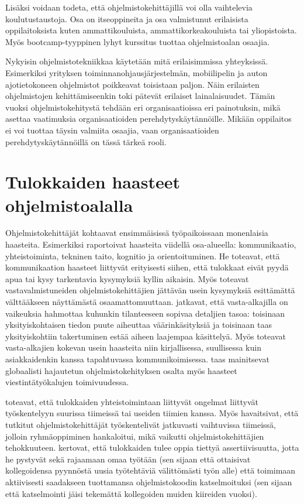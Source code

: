 \documentclass[utf8]{gradu3}
\begin{document}
Lisäksi voidaan todeta, että ohjelmistokehittäjillä voi olla vaihtelevia koulutustaustoja. Osa on itseoppineita ja osa valmistunut erilaisista oppilaitoksista kuten ammattikouluista, ammattikorkeakouluista tai yliopistoista. Myös bootcamp-tyyppinen lyhyt kurssitus tuottaa ohjelmistoalan osaajia. 

Nykyisin ohjelmistotekniikkaa käytetään mitä erilaisimmissa yhteyksissä. Esimerkiksi yrityksen toiminnanohjausjärjestelmän, mobiilipelin ja auton ajotietokoneen ohjelmistot poikkeavat toisistaan paljon. Näin erilaisten ohjelmistojen kehittämiseenkin toki pätevät erilaiset lainalaisuudet. Tämän vuoksi ohjelmistokehitystä tehdään eri organisaatioissa eri painotuksin, mikä asettaa vaatimuksia organisaatioiden perehdytyskäytännöille. Mikään oppilaitos ei voi tuottaa täysin valmiita osaajia, vaan organisaatioiden perehdytyskäytännöillä on tässä tärkeä rooli.

\section{Tulokkaiden haasteet ohjelmistoalalla}
\label{luku-tulokkaiden-haasteet}

Ohjelmistokehittäjät kohtaavat ensimmäisissä työpaikoissaan monenlaisia haasteita. Esimerkiksi \textcite{begel-simon-2008} raportoivat haasteita viidellä osa-alueella: kommunikaatio, yhteistoiminta, tekninen taito, kognitio ja orientoituminen. He toteavat, että kommunikaation haasteet liittyvät erityisesti siihen, että tulokkaat eivät pyydä apua tai kysy tarkentavia kysymyksiä kyllin aikaisin. Myös \textcite{radermacher-ym-2015} toteavat vastavalmistuneiden ohjelmistokehittäjien jättävän usein kysymyksiä esittämättä välttääkseen näyttämästä osaamattomuuttaan. \textcite{begel-simon-2008} jatkavat, että vasta-alkajilla on vaikeuksia hahmottaa kuhunkin tilanteeseen sopivaa detaljien tasoa: toisinaan yksityiskohtaisen tiedon puute aiheuttaa väärinkäsityksiä ja toisinaan taas yksityiskohtiin takertuminen estää aiheen laajempaa käsittelyä. Myös \textcite{radermacher-ym-2015} toteavat vasta-alkajien kokevan usein haasteita niin kirjallisessa, suullisessa kuin asiakkaidenkin kanssa tapahtuvassa kommunikoimisessa. \textcite{moe-ym-2020} taas mainitsevat globaalisti hajautetun ohjelmistokehityksen osalta myös haasteet viestintätyökalujen toimivuudessa.

\textcite{begel-simon-2008} toteavat, että tulokkaiden yhteistoimintaan liittyvät ongelmat liittyvät työskentelyyn suurissa tiimeissä tai useiden tiimien kanssa. Myös \textcite{britto-ym-2019} havaitsivat, että tutkitut ohjelmistokehittäjät työskentelivät jatkuvasti vaihtuvissa tiimeissä, jolloin ryhmäoppiminen hankaloitui, mikä vaikutti ohjelmistokehittäjien tehokkuuteen. \textcite{begel-simon-2008} kertovat, että tulokkaiden tulee oppia tiettyä assertiivisuutta, jotta he pystyvät sekä rajaamaan omaa työtään (sen sijaan että ottaisivat kollegoidensa pyynnöstä uusia työtehtäviä välittömästi työn alle) että toimimaan aktiivisesti saadakseen tuottamansa ohjelmistokoodin katselmoituksi (sen sijaan että katselmointi jäisi tekemättä kollegoiden muiden kiireiden vuoksi).
\end{document}

